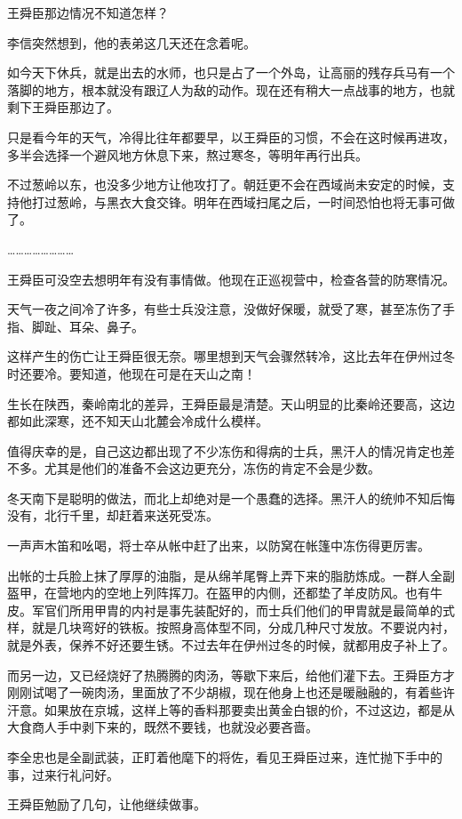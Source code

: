 王舜臣那边情况不知道怎样？

李信突然想到，他的表弟这几天还在念着呢。

如今天下休兵，就是出去的水师，也只是占了一个外岛，让高丽的残存兵马有一个落脚的地方，根本就没有跟辽人为敌的动作。现在还有稍大一点战事的地方，也就剩下王舜臣那边了。

只是看今年的天气，冷得比往年都要早，以王舜臣的习惯，不会在这时候再进攻，多半会选择一个避风地方休息下来，熬过寒冬，等明年再行出兵。

不过葱岭以东，也没多少地方让他攻打了。朝廷更不会在西域尚未安定的时候，支持他打过葱岭，与黑衣大食交锋。明年在西域扫尾之后，一时间恐怕也将无事可做了。

……………………

王舜臣可没空去想明年有没有事情做。他现在正巡视营中，检查各营的防寒情况。

天气一夜之间冷了许多，有些士兵没注意，没做好保暖，就受了寒，甚至冻伤了手指、脚趾、耳朵、鼻子。

这样产生的伤亡让王舜臣很无奈。哪里想到天气会骤然转冷，这比去年在伊州过冬时还要冷。要知道，他现在可是在天山之南！

生长在陕西，秦岭南北的差异，王舜臣最是清楚。天山明显的比秦岭还要高，这边都如此深寒，还不知天山北麓会冷成什么模样。

值得庆幸的是，自己这边都出现了不少冻伤和得病的士兵，黑汗人的情况肯定也差不多。尤其是他们的准备不会这边更充分，冻伤的肯定不会是少数。

冬天南下是聪明的做法，而北上却绝对是一个愚蠢的选择。黑汗人的统帅不知后悔没有，北行千里，却赶着来送死受冻。

一声声木笛和吆喝，将士卒从帐中赶了出来，以防窝在帐篷中冻伤得更厉害。

出帐的士兵脸上抹了厚厚的油脂，是从绵羊尾臀上弄下来的脂肪炼成。一群人全副盔甲，在营地内的空地上列阵挥刀。在盔甲的内侧，还都垫了羊皮防风。也有牛皮。军官们所用甲胄的内衬是事先装配好的，而士兵们他们的甲胄就是最简单的式样，就是几块弯好的铁板。按照身高体型不同，分成几种尺寸发放。不要说内衬，就是外表，保养不好还要生锈。不过去年在伊州过冬的时候，就都用皮子补上了。

而另一边，又已经烧好了热腾腾的肉汤，等歇下来后，给他们灌下去。王舜臣方才刚刚试喝了一碗肉汤，里面放了不少胡椒，现在他身上也还是暖融融的，有着些许汗意。如果放在京城，这样上等的香料那要卖出黄金白银的价，不过这边，都是从大食商人手中剥下来的，既然不要钱，也就没必要吝啬。

李全忠也是全副武装，正盯着他麾下的将佐，看见王舜臣过来，连忙抛下手中的事，过来行礼问好。

王舜臣勉励了几句，让他继续做事。

